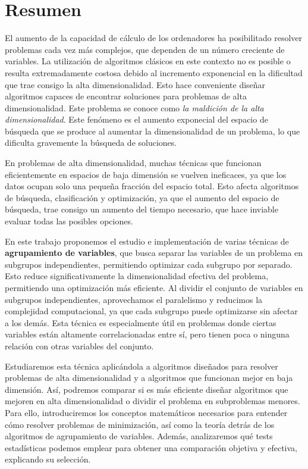 %

\chapter{Resumen}

\indent El aumento de la capacidad de cálculo de los ordenadores ha posibilitado resolver problemas cada vez más complejos, que dependen de un número creciente de variables. La utilización de algoritmos clásicos en este contexto no es posible o resulta extremadamente costosa debido al incremento exponencial en la dificultad que trae consigo la alta dimensionalidad. Esto hace conveniente diseñar algoritmos capaces de encontrar soluciones para problemas de alta dimensionalidad. Este problema se conoce como \textit{la maldición de la alta dimensionalidad}. Este fenómeno es el aumento exponecial del espacio de búsqueda que se produce al aumentar la dimensionalidad de un problema, lo que dificulta gravemente la búsqueda de soluciones.

En problemas de alta dimensionalidad, muchas técnicas que funcionan eficientemente en espacios de baja dimensión se vuelven ineficaces, ya que los datos ocupan solo una pequeña fracción del espacio total. Esto afecta algoritmos de búsqueda, clasificación y optimización, ya que el aumento del espacio de búsqueda, trae consigo un aumento del tiempo necesario, que hace inviable evaluar todas las posibles opciones.

En este trabajo proponemos el estudio e implementación de varias técnicas de \textbf{agrupamiento de variables}, que busca separar las variables de un problema en subgrupos independientes, permitiendo optimizar cada subgrupo por separado. Esto reduce significativamente la dimensionalidad efectiva del problema, permitiendo una optimización más eficiente. Al dividir el conjunto de variables en subgrupos independientes, aprovechamos el paralelismo y reducimos la complejidad computacional, ya que cada subgrupo puede optimizarse sin afectar a los demás. Esta técnica es especialmente útil en problemas donde ciertas variables están altamente correlacionadas entre sí, pero tienen poca o ninguna relación con otras variables del conjunto.

Estudiaremos esta técnica aplicándola a algoritmos diseñados para resolver problemas de alta dimensionalidad y a algoritmos que funcionan mejor en baja dimensión. Así, podremos comparar si es más eficiente diseñar algoritmos que mejoren en alta dimensionalidad o dividir el problema en subproblemas menores. Para ello, introduciremos los conceptos matemáticos necesarios para entender cómo resolver problemas de minimización, así como la teoría detrás de los algoritmos de agrupamiento de variables. Además, analizaremos qué tests estadísticas podemos emplear para obtener una comparación objetiva y efectiva, explicando su selección.

